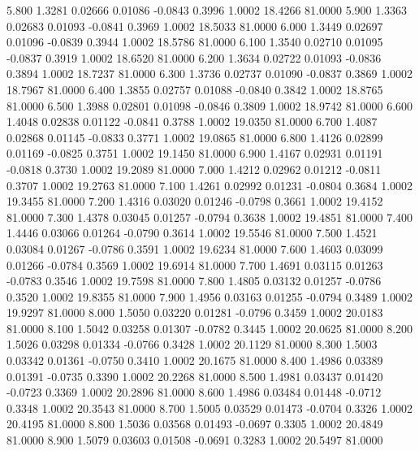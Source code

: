    5.800   1.3281   0.02666   0.01086  -0.0843   0.3996   1.0002  18.4266  81.0000
   5.900   1.3363   0.02683   0.01093  -0.0841   0.3969   1.0002  18.5033  81.0000
   6.000   1.3449   0.02697   0.01096  -0.0839   0.3944   1.0002  18.5786  81.0000
   6.100   1.3540   0.02710   0.01095  -0.0837   0.3919   1.0002  18.6520  81.0000
   6.200   1.3634   0.02722   0.01093  -0.0836   0.3894   1.0002  18.7237  81.0000
   6.300   1.3736   0.02737   0.01090  -0.0837   0.3869   1.0002  18.7967  81.0000
   6.400   1.3855   0.02757   0.01088  -0.0840   0.3842   1.0002  18.8765  81.0000
   6.500   1.3988   0.02801   0.01098  -0.0846   0.3809   1.0002  18.9742  81.0000
   6.600   1.4048   0.02838   0.01122  -0.0841   0.3788   1.0002  19.0350  81.0000
   6.700   1.4087   0.02868   0.01145  -0.0833   0.3771   1.0002  19.0865  81.0000
   6.800   1.4126   0.02899   0.01169  -0.0825   0.3751   1.0002  19.1450  81.0000
   6.900   1.4167   0.02931   0.01191  -0.0818   0.3730   1.0002  19.2089  81.0000
   7.000   1.4212   0.02962   0.01212  -0.0811   0.3707   1.0002  19.2763  81.0000
   7.100   1.4261   0.02992   0.01231  -0.0804   0.3684   1.0002  19.3455  81.0000
   7.200   1.4316   0.03020   0.01246  -0.0798   0.3661   1.0002  19.4152  81.0000
   7.300   1.4378   0.03045   0.01257  -0.0794   0.3638   1.0002  19.4851  81.0000
   7.400   1.4446   0.03066   0.01264  -0.0790   0.3614   1.0002  19.5546  81.0000
   7.500   1.4521   0.03084   0.01267  -0.0786   0.3591   1.0002  19.6234  81.0000
   7.600   1.4603   0.03099   0.01266  -0.0784   0.3569   1.0002  19.6914  81.0000
   7.700   1.4691   0.03115   0.01263  -0.0783   0.3546   1.0002  19.7598  81.0000
   7.800   1.4805   0.03132   0.01257  -0.0786   0.3520   1.0002  19.8355  81.0000
   7.900   1.4956   0.03163   0.01255  -0.0794   0.3489   1.0002  19.9297  81.0000
   8.000   1.5050   0.03220   0.01281  -0.0796   0.3459   1.0002  20.0183  81.0000
   8.100   1.5042   0.03258   0.01307  -0.0782   0.3445   1.0002  20.0625  81.0000
   8.200   1.5026   0.03298   0.01334  -0.0766   0.3428   1.0002  20.1129  81.0000
   8.300   1.5003   0.03342   0.01361  -0.0750   0.3410   1.0002  20.1675  81.0000
   8.400   1.4986   0.03389   0.01391  -0.0735   0.3390   1.0002  20.2268  81.0000
   8.500   1.4981   0.03437   0.01420  -0.0723   0.3369   1.0002  20.2896  81.0000
   8.600   1.4986   0.03484   0.01448  -0.0712   0.3348   1.0002  20.3543  81.0000
   8.700   1.5005   0.03529   0.01473  -0.0704   0.3326   1.0002  20.4195  81.0000
   8.800   1.5036   0.03568   0.01493  -0.0697   0.3305   1.0002  20.4849  81.0000
   8.900   1.5079   0.03603   0.01508  -0.0691   0.3283   1.0002  20.5497  81.0000
